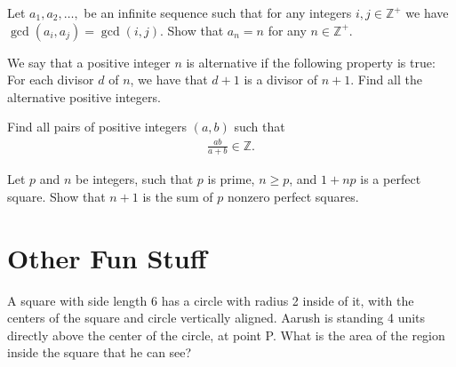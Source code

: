 \begin{problem}[D][6][Russia 1995 10/5]
    Let $a_1, a_2, \ldots, $ be an infinite sequence such that for any integers $i,j \in \mathbb{Z}^+$ we have $\gcd(a_i, a_j) = \gcd(i, j)$. Show that $a_n = n$ for any $n \in \mathbb{Z^+}$.
\end{problem}


\begin{problem}[D][4][Cuba 2022/2]
    We say that a positive integer $n$ is alternative if the following property is true: For each divisor $d$ of $n$, we have that $d+1$ is a divisor of $n+1$. Find all the alternative positive integers.
\end{problem}

\begin{problem}[D][6][Andreescu]
    Find all pairs of positive integers $(a,b)$ such that 
    \begin{align*}
        \frac{ab}{a + b} \in \mathbb{Z}.
    \end{align*}
\end{problem}

\begin{problem}[D][5][Spain 2015/5]
    Let $p$ and $n$ be integers, such that $p$ is prime, $n \geq p$, and $1 + np$ is a perfect square. Show that $n + 1$ is the sum of $p$ nonzero perfect squares.  
\end{problem}

\section{Other Fun Stuff}\setcounter{problem}{0}

\begin{problem}
    A square with side length 6 has a circle with radius 2 inside of it, with the centers of the square and circle vertically aligned. Aarush is standing 4 units directly above the center of the circle, at point P. What is the area of the region inside the square that he can see?

    \begin{center}
\end{center}
\end{problem}

